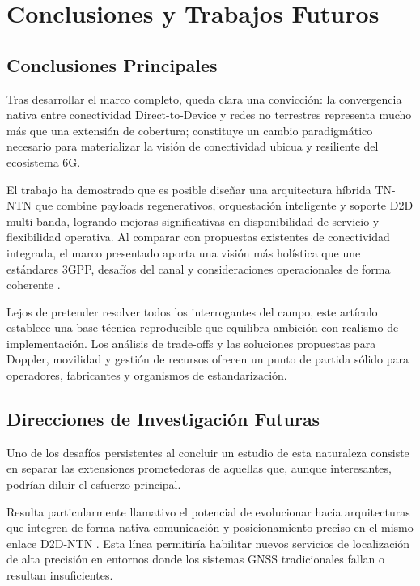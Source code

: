 \section{Conclusiones y Trabajos Futuros}

\subsection{Conclusiones Principales}

Tras desarrollar el marco completo, queda clara una convicción: la convergencia nativa entre conectividad Direct-to-Device y redes no terrestres representa mucho más que una extensión de cobertura; constituye un cambio paradigmático necesario para materializar la visión de conectividad ubicua y resiliente del ecosistema 6G.

El trabajo ha demostrado que es posible diseñar una arquitectura híbrida TN-NTN que combine payloads regenerativos, orquestación inteligente y soporte D2D multi-banda, logrando mejoras significativas en disponibilidad de servicio y flexibilidad operativa. Al comparar con propuestas existentes de conectividad integrada, el marco presentado aporta una visión más holística que une estándares 3GPP, desafíos del canal y consideraciones operacionales de forma coherente \cite{Ullah2026_D2D}.

Lejos de pretender resolver todos los interrogantes del campo, este artículo establece una base técnica reproducible que equilibra ambición con realismo de implementación. Los análisis de trade-offs y las soluciones propuestas para Doppler, movilidad y gestión de recursos ofrecen un punto de partida sólido para operadores, fabricantes y organismos de estandarización.

\subsection{Direcciones de Investigación Futuras}

Uno de los desafíos persistentes al concluir un estudio de esta naturaleza consiste en separar las extensiones prometedoras de aquellas que, aunque interesantes, podrían diluir el esfuerzo principal.

Resulta particularmente llamativo el potencial de evolucionar hacia arquitecturas que integren de forma nativa comunicación y posicionamiento preciso en el mismo enlace D2D-NTN \cite{DeGaudenzi2026_NTN}. Esta línea permitiría habilitar nuevos servicios de localización de alta precisión en entornos donde los sistemas GNSS tradicionales fallan o resultan insuficientes.

